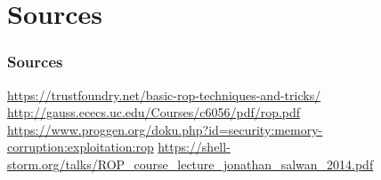 \documentclass[11pt]{beamer}
\begin{document}
\section*{Sources}
\begin{frame}
    \frametitle{Sources}
    \url{https://trustfoundry.net/basic-rop-techniques-and-tricks/}
    \url{http://gauss.ececs.uc.edu/Courses/c6056/pdf/rop.pdf}
    \url{https://www.proggen.org/doku.php?id=security:memory-corruption:exploitation:rop}
    \url{https://shell-storm.org/talks/ROP_course_lecture_jonathan_salwan_2014.pdf}
\end{frame}
\end{document}
